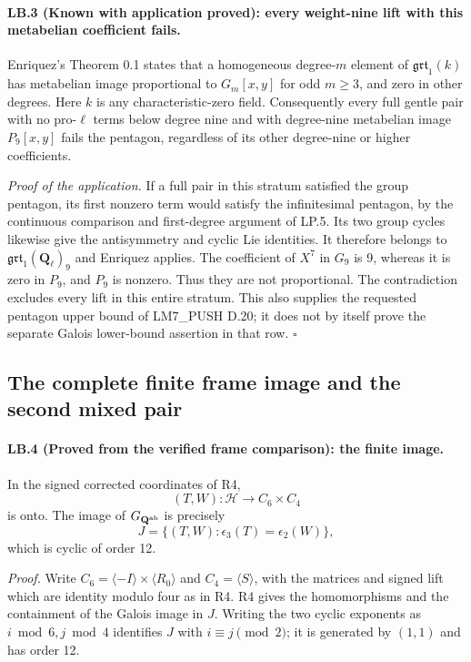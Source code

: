 \paragraph{LB.3 (Known with application proved): every weight-nine lift with this metabelian coefficient fails.}
Enriquez's Theorem 0.1 states that a homogeneous degree-$m$
element of $\mathfrak{grt}_1(k)$ has metabelian image proportional
to $G_m[x,y]$ for odd $m\geq3$, and zero in other degrees.
Here $k$ is any characteristic-zero field. Consequently every
full gentle pair with no pro-$\ell$ terms below degree nine and
with degree-nine metabelian image $P_9[x,y]$ fails the pentagon,
regardless of its other degree-nine or higher coefficients.

\emph{Proof of the application.}
If a full pair in this stratum satisfied the group pentagon, its
first nonzero term would satisfy the infinitesimal pentagon, by
the continuous comparison and first-degree argument of LP.5.
Its two group cycles likewise give the antisymmetry and cyclic
Lie identities. It therefore belongs to
$\mathfrak{grt}_1(\mathbf Q_\ell)_9$ and Enriquez applies.
The coefficient of $X^7$ in $G_9$ is 9, whereas it is zero in
$P_9$, and $P_9$ is nonzero. Thus they are not proportional.
The contradiction excludes every lift in this entire stratum.
This also supplies the requested pentagon upper bound of
LM7\_PUSH D.20; it does not by itself prove the separate
Galois lower-bound assertion in that row. \hfill$\square$

\subsection{The complete finite frame image and the second mixed pair}

\paragraph{LB.4 (Proved from the verified frame comparison): the finite image.}
In the signed corrected coordinates of R4,
\[
 (T,W):\mathcal H\longrightarrow C_6\times C_4
\]
is onto. The image of $G_{\mathbf Q^{\rm ab}}$ is precisely
\[
 J=\{(T,W):\epsilon_3(T)=\epsilon_2(W)\},
\]
which is cyclic of order 12.

\emph{Proof.}
Write $C_6=\langle -I\rangle\times\langle R_0\rangle$ and
$C_4=\langle S\rangle$, with the matrices and signed lift
which are identity modulo four as in R4. R4 gives the
homomorphisms and the containment of the Galois image in $J$.
Writing the two cyclic exponents as $i\bmod6,j\bmod4$ identifies
$J$ with $i\equiv j\pmod2$; it is generated by $(1,1)$ and has
order 12.

